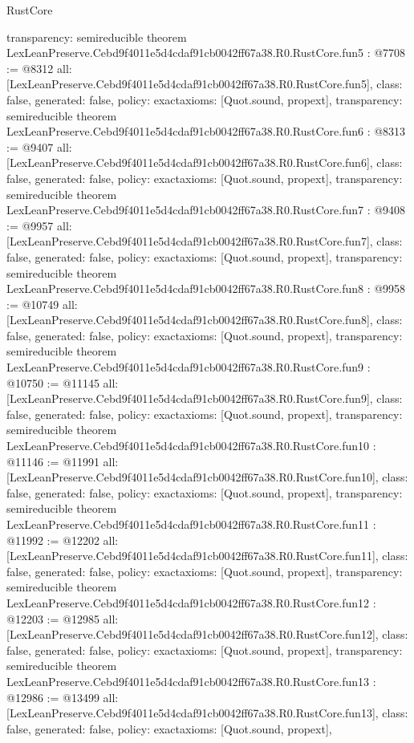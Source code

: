 \begin{lexlean}{RustCore}
\begin{coremodule}
{  transparency: semireducible
}
theorem LexLeanPreserve.Cebd9f4011e5d4cdaf91cb0042ff67a38.R0.RustCore.fun5 : @7708 := @8312 {
  all: [LexLeanPreserve.Cebd9f4011e5d4cdaf91cb0042ff67a38.R0.RustCore.fun5],
  class: false,
  generated: false,
  policy: exact{axioms: [Quot.sound, propext]},
  transparency: semireducible
}
theorem LexLeanPreserve.Cebd9f4011e5d4cdaf91cb0042ff67a38.R0.RustCore.fun6 : @8313 := @9407 {
  all: [LexLeanPreserve.Cebd9f4011e5d4cdaf91cb0042ff67a38.R0.RustCore.fun6],
  class: false,
  generated: false,
  policy: exact{axioms: [Quot.sound, propext]},
  transparency: semireducible
}
theorem LexLeanPreserve.Cebd9f4011e5d4cdaf91cb0042ff67a38.R0.RustCore.fun7 : @9408 := @9957 {
  all: [LexLeanPreserve.Cebd9f4011e5d4cdaf91cb0042ff67a38.R0.RustCore.fun7],
  class: false,
  generated: false,
  policy: exact{axioms: [Quot.sound, propext]},
  transparency: semireducible
}
theorem LexLeanPreserve.Cebd9f4011e5d4cdaf91cb0042ff67a38.R0.RustCore.fun8 : @9958 := @10749 {
  all: [LexLeanPreserve.Cebd9f4011e5d4cdaf91cb0042ff67a38.R0.RustCore.fun8],
  class: false,
  generated: false,
  policy: exact{axioms: [Quot.sound, propext]},
  transparency: semireducible
}
theorem LexLeanPreserve.Cebd9f4011e5d4cdaf91cb0042ff67a38.R0.RustCore.fun9 : @10750 := @11145 {
  all: [LexLeanPreserve.Cebd9f4011e5d4cdaf91cb0042ff67a38.R0.RustCore.fun9],
  class: false,
  generated: false,
  policy: exact{axioms: [Quot.sound, propext]},
  transparency: semireducible
}
theorem LexLeanPreserve.Cebd9f4011e5d4cdaf91cb0042ff67a38.R0.RustCore.fun10 : @11146 := @11991 {
  all: [LexLeanPreserve.Cebd9f4011e5d4cdaf91cb0042ff67a38.R0.RustCore.fun10],
  class: false,
  generated: false,
  policy: exact{axioms: [Quot.sound, propext]},
  transparency: semireducible
}
theorem LexLeanPreserve.Cebd9f4011e5d4cdaf91cb0042ff67a38.R0.RustCore.fun11 : @11992 := @12202 {
  all: [LexLeanPreserve.Cebd9f4011e5d4cdaf91cb0042ff67a38.R0.RustCore.fun11],
  class: false,
  generated: false,
  policy: exact{axioms: [Quot.sound, propext]},
  transparency: semireducible
}
theorem LexLeanPreserve.Cebd9f4011e5d4cdaf91cb0042ff67a38.R0.RustCore.fun12 : @12203 := @12985 {
  all: [LexLeanPreserve.Cebd9f4011e5d4cdaf91cb0042ff67a38.R0.RustCore.fun12],
  class: false,
  generated: false,
  policy: exact{axioms: [Quot.sound, propext]},
  transparency: semireducible
}
theorem LexLeanPreserve.Cebd9f4011e5d4cdaf91cb0042ff67a38.R0.RustCore.fun13 : @12986 := @13499 {
  all: [LexLeanPreserve.Cebd9f4011e5d4cdaf91cb0042ff67a38.R0.RustCore.fun13],
  class: false,
  generated: false,
  policy: exact{axioms: [Quot.sound, propext]},
}
\end{coremodule}
\end{lexlean}
